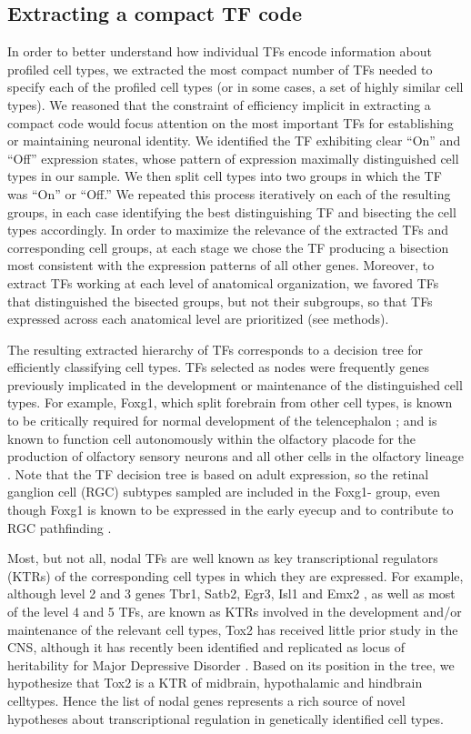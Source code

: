 \subsection{Extracting a compact TF code}
In order to better understand how individual TFs encode information about profiled cell types, we extracted the most compact number of TFs needed to specify each of the profiled cell types (or in some cases, a set of highly similar cell types). We reasoned that the constraint of efficiency implicit in extracting a compact code would focus attention on the most important TFs for establishing or maintaining neuronal identity. We identified the TF exhibiting clear “On” and “Off” expression states, whose pattern of expression maximally distinguished cell types in our sample. We then split cell types into two groups in which the TF was “On” or “Off.” We repeated this process iteratively on each of the resulting groups, in each case identifying the best distinguishing TF and bisecting the cell types accordingly. In order to maximize the relevance of the extracted TFs and corresponding cell groups, at each stage we chose the TF producing a bisection most consistent with the expression patterns of all other genes. Moreover, to extract TFs working at each level of anatomical organization, we favored TFs that distinguished the bisected groups, but not their subgroups, so that TFs expressed across each anatomical level are prioritized (see methods).

The resulting extracted hierarchy of TFs corresponds to a decision tree \cite{Saeys_2007} for efficiently classifying cell types\cite{Gabitto_2016}.
TFs selected as nodes were frequently genes previously implicated in the development or maintenance of the distinguished cell types. For example, Foxg1, which split forebrain from other cell types, is known to be critically required for normal development of the telencephalon \cite{Xuan_1995}; \cite{Danesin_2012} and is known to function cell autonomously within the olfactory placode for the production of olfactory sensory neurons and all other cells in the olfactory lineage \cite{Duggan_2008}. Note that the TF decision tree is based on adult expression, so the retinal ganglion cell (RGC) subtypes sampled are included in the Foxg1- group, even though Foxg1 is known to be expressed in the early eyecup and to contribute to RGC pathfinding \cite{Schulte_2005}.

Most, but not all, nodal TFs are well known as key transcriptional regulators (KTRs) of the corresponding cell types in which they are expressed. For example, although level 2 and 3 genes Tbr1\cite{Bedogni_2010}, Satb2\cite{Sweeney_2017}, Egr3\cite{Chandra_2015}, Isl1\cite{Lu_2013} and Emx2 \cite{Zhang_2016}, as well as most of the level 4 and 5 TFs, are known as KTRs involved in the development and/or maintenance of the relevant cell types, Tox2 has received little prior study in the CNS, although it has recently been identified and replicated as locus of heritability for Major Depressive Disorder \cite{Zeng_2016}. Based on its position in the tree, we hypothesize that Tox2 is a KTR of midbrain, hypothalamic and hindbrain celltypes. Hence the list of nodal genes represents a rich source of novel hypotheses about transcriptional regulation in genetically identified cell types.

